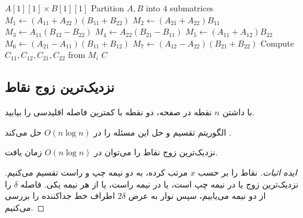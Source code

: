 \documentclass{matinbook}
\begin{document}
    \begin{latin}
        \begin{algorithm}
            \begin{algorithmic}[1]
                \State \Return $A[1][1] \times B[1][1]$
                \EndIf
                \State Partition $A, B$ into $4$ submatrices
                \State $M_{1} \gets (A_{11}+A_{22})(B_{11}+B_{22})$
                \State $M_{2} \gets (A_{21}+A_{22})B_{11}$
                \State $M_{3} \gets A_{11}(B_{12}-B_{22})$
                \State $M_{4} \gets A_{22}(B_{21}-B_{11})$
                \State $M_{5} \gets (A_{11}+A_{12})B_{22}$
                \State $M_{6} \gets (A_{21}-A_{11})(B_{11}+B_{12})$
                \State $M_{7} \gets (A_{12}-A_{22})(B_{21}+B_{22})$
                \State Compute $C_{11}, C_{12}, C_{21}, C_{22}$ from $M_{i}$
                \State \Return $C$
                \EndFunction
            \end{algorithmic}
        \end{algorithm}
    \end{latin}
    
    \subsection{نزدیک‌ترین زوج نقاط}
    
    \begin{definition}
        با داشتن $n$ نقطه در صفحه،
        دو نقطه با کمترین فاصله اقلیدسی را بیابید.
        \label{def:closest-pair}
    \end{definition}
    
    الگوریتم تقسیم و حل این مسئله را در
    $O(n \log n)$ حل می‌کند \cite{cormen2009}.
    
    \begin{theorem}
        نزدیک‌ترین زوج نقاط را می‌توان در
        $O(n \log n)$ زمان یافت.
        \label{thm:closest-pair}
    \end{theorem}
    
    \begin{proof}[ایده اثبات]
        نقاط را بر حسب $x$ مرتب کرده،
        به دو نیمه چپ و راست تقسیم می‌کنیم.
        نزدیک‌ترین زوج یا در نیمه چپ است،
        یا در نیمه راست، یا از هر نیمه یکی.
        فاصله $\delta$ را از دو نیمه می‌یابیم،
        سپس نوار به عرض $2\delta$ اطراف خط جداکننده
        را بررسی می‌کنیم.
    \end{proof}
    
\end{document}
